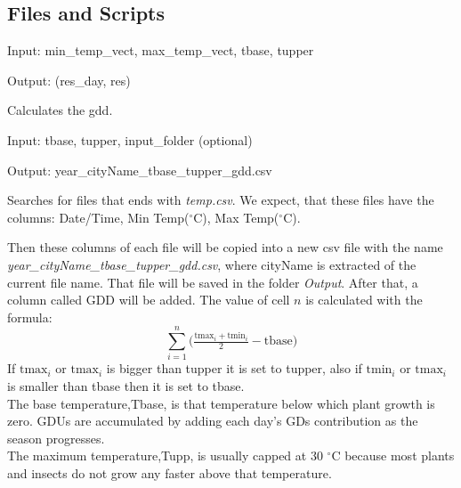 \documentclass[12pt]{article}
\begin{document}
\subsection{Files and Scripts}
\begin{description}
\item[calc\_gdd.py]
\item Input: min\_temp\_vect, max\_temp\_vect, tbase, tupper
\item Output: (res\_day, res)
\item Calculates the gdd. %


\item[gdd.py]
\item Input: tbase, tupper, input\_folder (optional)
\item Output: year\_cityName\_tbase\_tupper\_gdd.csv
\item Searches for files that ends with \emph{temp.csv}. We expect, that these
files have the columns: Date/Time, Min Temp(${}^\circ$C), Max Temp(${}^\circ$C).

Then these columns of each file will be copied into a new csv file with the name
\emph{year\_cityName\_tbase\_tupper\_gdd.csv}, where cityName is extracted of the
current file name. That file will be saved in the folder \emph{Output}.
After that, a column called GDD will be added. 
The value of
cell $n$ is calculated with the formula:
$$
\sum_{i=1}^n \big( \tfrac{\text{tmax}_i+\text{tmin}_i}{2}-\text{tbase}\big)
$$
If $\text{tmax}_i$ or $\text{tmax}_i$ is bigger than tupper it is set to tupper,
 also if $\text{tmin}_i$ or $\text{tmax}_i$ 
is  smaller than tbase then it is set to tbase.
\\The base temperature,Tbase, is that temperature below which plant growth is zero.
 GDUs are accumulated by adding each day's GDs contribution as the season progresses.
\\ The maximum temperature,Tupp, is usually capped at 30 ${}^\circ$C because most plants and 
insects do not grow any faster above that temperature.


\end{description}
\end{document}
